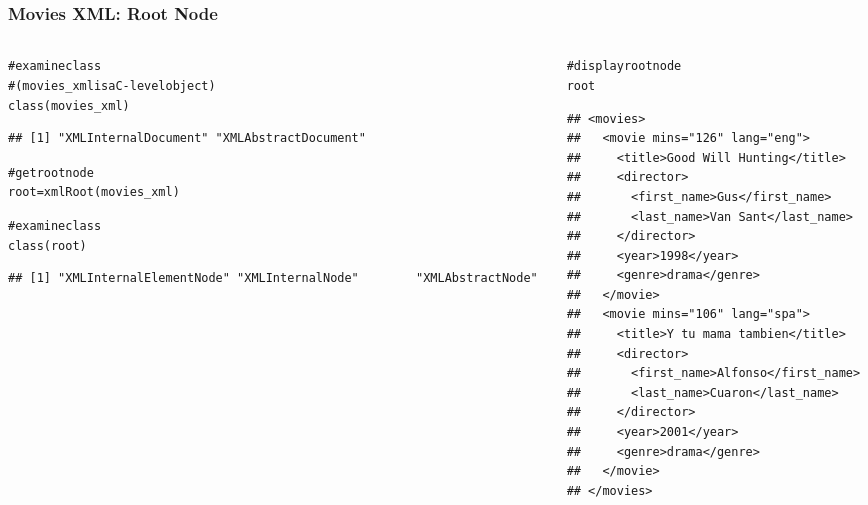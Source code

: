 \documentclass{beamer}\usepackage[]{graphicx}\usepackage[]{color}
\makeatletter
\newcommand{\hlcom}[1]{\textcolor[rgb]{0.588,0.588,0.588}{#1}}%
\newcommand{\hlstd}[1]{\textcolor[rgb]{0.196,0.196,0.196}{#1}}%
\newcommand{\hlkwb}[1]{\textcolor[rgb]{0.627,0,0.314}{#1}}%
\newcommand{\hlkwd}[1]{\textcolor[rgb]{0.78,0.227,0.412}{#1}}%
\newenvironment{kframe}{%
 \def\at@end@of@kframe{}%
 \ifinner\ifhmode%
  \def\at@end@of@kframe{\end{minipage}}%
  \begin{minipage}{\columnwidth}%
 \fi\fi%
 \def\FrameCommand##1{\hskip\@totalleftmargin \hskip-\fboxsep
 \colorbox{shadecolor}{##1}\hskip-\fboxsep
     \hskip-\linewidth \hskip-\@totalleftmargin \hskip\columnwidth}%
 \MakeFramed {\advance\hsize-\width
   \@totalleftmargin\z@ \linewidth\hsize
   \@setminipage}}%
 {\par\unskip\endMakeFramed%
 \at@end@of@kframe}
\newenvironment{knitrout}{}{} %
\makeatother
\begin{document}

\begin{frame}[fragile]
\frametitle{Movies XML: Root Node}

\begin{columns}[t]
\begin{column}{0.5\textwidth}
\begin{knitrout}\tiny
{}\color{fgcolor}\begin{kframe}
\begin{alltt}
\hlcom{# examine class}
\hlcom{# (movies_xml is a C-level object)}
\hlkwd{class}\hlstd{(movies_xml)}
\end{alltt}
\begin{verbatim}
## [1] "XMLInternalDocument" "XMLAbstractDocument"
\end{verbatim}
\begin{alltt}
\hlcom{# get root node}
\hlstd{root} \hlkwb{=} \hlkwd{xmlRoot}\hlstd{(movies_xml)}

\hlcom{# examine class}
\hlkwd{class}\hlstd{(root)}
\end{alltt}
\begin{verbatim}
## [1] "XMLInternalElementNode" "XMLInternalNode"        "XMLAbstractNode"
\end{verbatim}
\end{kframe}
\end{knitrout}
\end{column}

\begin{column}{0.5\textwidth}
\begin{knitrout}\tiny
{}\color{fgcolor}\begin{kframe}
\begin{alltt}
\hlcom{# display root node}
\hlstd{root}
\end{alltt}
\begin{verbatim}
## <movies>
##   <movie mins="126" lang="eng">
##     <title>Good Will Hunting</title>
##     <director>
##       <first_name>Gus</first_name>
##       <last_name>Van Sant</last_name>
##     </director>
##     <year>1998</year>
##     <genre>drama</genre>
##   </movie>
##   <movie mins="106" lang="spa">
##     <title>Y tu mama tambien</title>
##     <director>
##       <first_name>Alfonso</first_name>
##       <last_name>Cuaron</last_name>
##     </director>
##     <year>2001</year>
##     <genre>drama</genre>
##   </movie>
## </movies>
\end{verbatim}
\end{kframe}
\end{knitrout}
\end{column}
\end{columns}

\end{frame}
\end{document}

